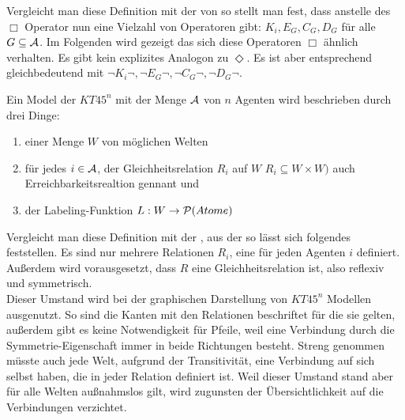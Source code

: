 Vergleicht man diese Definition mit der von 
 so stellt man fest, dass anstelle des 
$\Box$ Operator nun eine Vielzahl von Operatoren gibt: 
$K_i, E_G, C_G, D_G$ für alle $ G \subseteq \mathcal{A}$.
Im Folgenden wird gezeigt das sich diese Operatoren $\Box$ ähnlich verhalten.
Es gibt kein explizites Analogon zu $\Diamond$.
Es ist aber entsprechend gleichbedeutend mit $\neg K_i \neg, \neg E_G \neg, \neg C_G \neg, \neg D_G \neg$.


\begin{definition}
	Ein Model \MMModelDef der \MML $KT45^n$ mit der Menge $\mathcal{A}$ von $n$ Agenten wird beschrieben durch drei Dinge:
	\begin{enumerate}
		\item einer Menge $W$ von möglichen Welten
		\item für jedes $i \in \mathcal{A}$, der Gleichheitsrelation $R_i$ auf $W$ $R_i \subseteq W \times W)$ auch Erreichbarkeitsrealtion gennant und
		\item der Labeling-Funktion $L: W \rightarrow \mathcal{P}(Atome)$
	\end{enumerate}
	\cite[S.336f]{huth2004logic}
\end{definition}

Vergleicht man diese Definition mit der , aus der \ML so lässt sich folgendes feststellen.
Es sind nur mehrere Relationen $R_i$, eine für jeden Agenten $i$ definiert.
Außerdem wird vorausgesetzt, dass $R$ eine Gleichheitsrelation ist, also reflexiv und symmetrisch.\\
Dieser Umstand wird bei der graphischen Darstellung von $KT45^n$ Modellen ausgenutzt.
So sind die Kanten mit den Relationen beschriftet für die sie gelten, außerdem gibt es keine Notwendigkeit für Pfeile, weil eine Verbindung durch die Symmetrie-Eigenschaft immer in beide Richtungen besteht.
Streng genommen müsste auch jede Welt, aufgrund der Transitivität, eine Verbindung auf sich selbst haben, die in jeder Relation definiert ist.
Weil dieser Umstand stand aber für alle Welten außnahmslos gilt, wird zugunsten der Übersichtlichkeit auf die Verbindungen verzichtet. 




